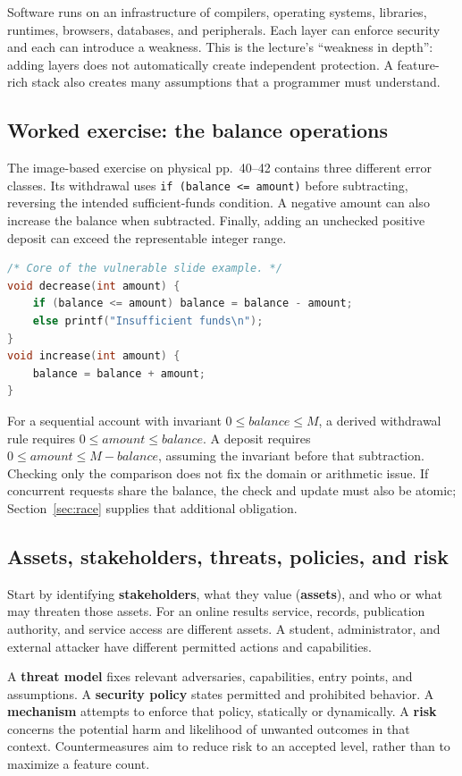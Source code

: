 \documentclass[11pt,a4paper]{article}
\numberwithin{figure}{section}
\begin{document}
Software runs on an infrastructure of compilers, operating systems, libraries, runtimes, browsers, databases, and peripherals. Each layer can enforce security and each can introduce a weakness. This is the lecture's ``weakness in depth'': adding layers does not automatically create independent protection. A feature-rich stack also creates many assumptions that a programmer must understand.

\subsection{Worked exercise: the balance operations}
The image-based exercise on physical pp.~40--42 contains three different error classes. Its withdrawal uses \texttt{if (balance <= amount)} before subtracting, reversing the intended sufficient-funds condition. A negative amount can also increase the balance when subtracted. Finally, adding an unchecked positive deposit can exceed the representable integer range.
\begin{lstlisting}[language=C]
/* Core of the vulnerable slide example. */
void decrease(int amount) {
    if (balance <= amount) balance = balance - amount;
    else printf("Insufficient funds\n");
}
void increase(int amount) {
    balance = balance + amount;
}
\end{lstlisting}
For a sequential account with invariant $0\le balance\le M$, a derived withdrawal rule requires $0\le amount\le balance$. A deposit requires $0\le amount\le M-balance$, assuming the invariant before that subtraction. Checking only the comparison does not fix the domain or arithmetic issue. If concurrent requests share the balance, the check and update must also be atomic; Section~\ref{sec:race} supplies that additional obligation.

\subsection{Assets, stakeholders, threats, policies, and risk}
Start by identifying \textbf{stakeholders}, what they value (\textbf{assets}), and who or what may threaten those assets. For an online results service, records, publication authority, and service access are different assets. A student, administrator, and external attacker have different permitted actions and capabilities.

A \textbf{threat model} fixes relevant adversaries, capabilities, entry points, and assumptions. A \textbf{security policy} states permitted and prohibited behavior. A \textbf{mechanism} attempts to enforce that policy, statically or dynamically. A \textbf{risk} concerns the potential harm and likelihood of unwanted outcomes in that context. Countermeasures aim to reduce risk to an accepted level, rather than to maximize a feature count.
\end{document}
